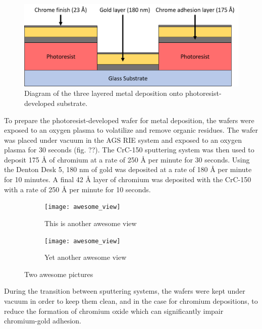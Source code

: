 \begin{figure}[h]
    \centering
    \includegraphics[width=\textwidth]{images/metal_deposition_diagram.png}
    \caption[Diagram of metal deposition onto photoresist-developed substrate]{Diagram of the three layered metal deposition onto photoresist-developed substrate.}
    \label{fig:metal_deposition}
\end{figure}

\par To prepare the photoresist-developed wafer for metal deposition, the wafers were exposed to an oxygen plasma to volatilize and remove organic residues. The wafer was placed under vacuum in the AGS RIE system and exposed to an oxygen plasma for 30 seconds (fig. ??). The CrC-150 sputtering system was then used to deposit 175 \si{\angstrom} of chromium at a rate of 250 \si{\angstrom} per minute for 30 seconds. Using the Denton Desk 5, 180 nm of gold was deposited at a rate of 180 \si{\angstrom} per minute for 10 minutes. A final 42 \si{\angstrom} layer of chromium was deposited with the CrC-150 with a rate of 250 \si{\angstrom} per minute for 10 seconds. 

  \begin{figure}[h]
    \centering
    \begin{subfigure}[b]{0.45\textwidth}
        \centering
        \texttt{[image: awesome\_view]}
        \caption{This is another awesome view}
        \label{fig:another_awesome_view_a}
    \end{subfigure}
    \hfill
    \begin{subfigure}[b]{0.45\textwidth}
        \centering
        \texttt{[image: awesome\_view]}
        \caption{Yet another awesome view}
        \label{fig:another_awesome_view_b}
    \end{subfigure} 
    \caption{Two awesome pictures}
    \label{fig:two_awesome_pictures}
 \end{figure}

\par During the transition between sputtering systems, the wafers were kept under vacuum in order to keep them clean, and in the case for chromium depositions, to reduce the formation of chromium oxide which can significantly impair chromium-gold adhesion.

